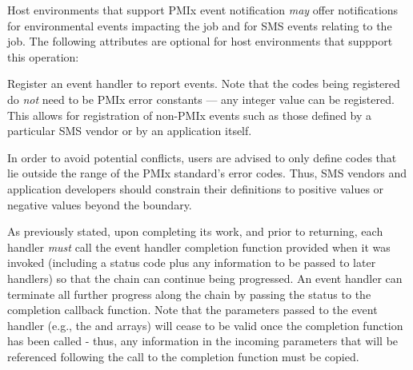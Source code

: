 
\reqattrend

\optattrstart
Host environments that support \ac{PMIx} event notification \textit{may} offer notifications for environmental events impacting the job and for \ac{SMS} events relating to the job. The following attributes are optional for host environments that suppport this operation:


\optattrend

\descr

Register an event handler to report events. Note that the codes being registered do \textit{not} need to be \ac{PMIx} error constants --- any integer value can be registered. This allows for registration of non-PMIx events such as those defined by a particular \ac{SMS} vendor or by an application itself.

\adviceuserstart
In order to avoid potential conflicts, users are advised to only define codes that lie outside the range of the \ac{PMIx} standard's error codes. Thus, \ac{SMS} vendors and application developers should constrain their definitions to positive values or negative values beyond the  boundary.
\adviceuserend


\adviceuserstart
As previously stated, upon completing its work, and prior to returning, each handler \textit{must} call the event handler completion function provided when it was invoked (including a status code plus any information to be passed to later handlers) so that the chain can continue being progressed. An event handler can terminate all further progress along the chain by passing the  status to the completion callback function. Note that the parameters passed to the event handler (e.g., the  and  arrays) will cease to be valid once the completion function has been called - thus, any information in the incoming parameters that will be referenced following the call to the completion function must be copied.
\adviceuserend

\subsection{}

